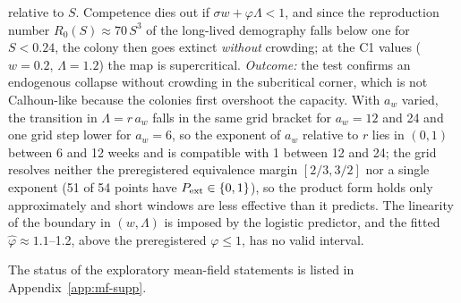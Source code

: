 \begin{description}
  relative to $S$. Competence dies out if $\sigma w+\varphi\Lambda<1$, and since the reproduction number
  $R_0(S)\approx70\,S^3$ of the long-lived demography falls below one for $S<0.24$, the colony then goes extinct
  \emph{without} crowding; at the \textsf{C1} values ($w=0.2$, $\Lambda=1.2$) the map is supercritical.
  \emph{Outcome:} the test confirms an endogenous collapse without crowding in the subcritical corner, which is not
  Calhoun-like because the colonies first overshoot the capacity. With $a_w$ varied, the transition in
  $\Lambda=r\,a_w$ falls in the same grid bracket for $a_w=12$ and 24 and one grid step lower for $a_w=6$, so the
  exponent of $a_w$ relative to $r$ lies in $(0,1)$ between 6 and 12 weeks and is compatible with 1 between 12 and
  24; the grid resolves neither the preregistered equivalence margin $[2/3,3/2]$ nor a single exponent (51 of 54
  points have $P_{\rm ext}\in\{0,1\}$), so the product form holds only approximately and short windows are less
  effective than it predicts. The linearity of the boundary in $(w,\Lambda)$ is imposed by the logistic predictor,
  and the fitted $\hat\varphi\approx1.1$--1.2, above the preregistered $\varphi\le1$, has no valid interval.
\end{description}
The status of the exploratory mean-field statements is listed in Appendix~\ref{app:mf-supp}.
